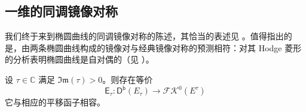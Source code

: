 \subsection{一维的同调镜像对称}\label{ch7.3}


我们终于来到椭圆曲线的同调镜像对称的陈述，其恰当的表述见 \cite[定理 4.1]{[Kre00]}。值得指出的是，由两条椭圆曲线构成的镜像对与经典镜像对称的预测相符：对其 Hodge 菱形的分析表明椭圆曲线是自对偶的（见 \cite[例 7.10]{[Imp21]}）。  

\begin{Thm}\label{HMSindim1}
设 $\tau\in\mathbb{C}$ 满足 $\mathfrak{Im}(\tau)>0$。则存在等价
\begin{equation}
	\mathsf{E}_\tau:\mathsf{D^b}(E_\tau)\rightarrow\mathscr{F\!K}^0(E^\tau)
\end{equation}
它与相应的平移函子相容。
\end{Thm}

